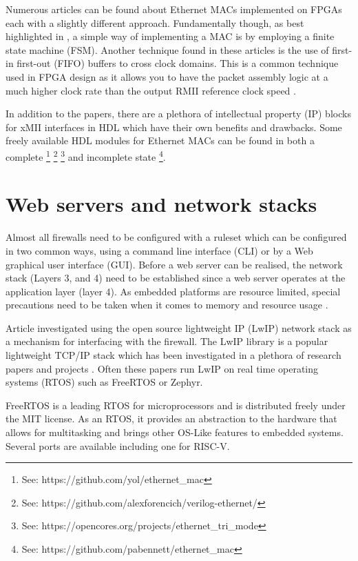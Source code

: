 Numerous articles \cite{OptimisedEthernetMAC} \cite{EthernetAXI} \cite{EthernetRMII} can be found about Ethernet MACs implemented 
on FPGAs each with a slightly different approach. Fundamentally though, as best highlighted in \cite{OptimisedEthernetMAC}, a simple way of implementing a MAC is by employing a finite state 
machine (FSM). Another technique found in these articles is the use of first-in first-out (FIFO) buffers to cross clock domains. This is a common technique used 
in FPGA design as it allows you to have the packet assembly logic at a much higher clock rate than the output RMII reference clock speed \cite{EthernetAXI}. 

In addition to the papers, there are a plethora of intellectual property (IP) blocks for xMII interfaces in HDL 
which have their own benefits and drawbacks. Some freely available HDL modules for Ethernet MACs can be found in both a complete \footnote[1]{See: https://github.com/yol/ethernet\_mac} \footnote[2]{See: https://github.com/alexforencich/verilog-ethernet/} 
\footnote[3]{See: https://opencores.org/projects/ethernet\_tri\_mode} and incomplete state
\footnote[4]{See: https://github.com/pabennett/ethernet\_mac}.






\section{Web servers and network stacks}

Almost all firewalls need to be configured with a ruleset which can be configured in two common ways, using a command line interface (CLI) 
or by a Web graphical user interface (GUI). Before a web server can be realised, the network stack (Layers 3, and 4) need to be established since a web server 
operates at the application layer (layer 4). As embedded platforms are resource limited, special precautions need to be taken when it comes to memory and resource 
usage \cite{OptimCortexLwIP}.

Article \cite{LwIPFPGAFirewall} investigated using the open source lightweight IP (LwIP) network stack as a mechanism for interfacing with the firewall. 
The LwIP library is a popular lightweight TCP/IP stack which has been investigated in a plethora of research papers and projects \cite{ImprovemntOptimLWIP} 
\cite{OptimCortexLwIP}. Often these papers run LwIP on real time operating systems (RTOS) such as FreeRTOS or Zephyr.

FreeRTOS is a leading RTOS for microprocessors and is distributed freely under the MIT license. As an RTOS, it provides an abstraction to the hardware that allows 
for multitasking and brings other OS-Like features to embedded systems. Several ports are available including one for RISC-V. 

